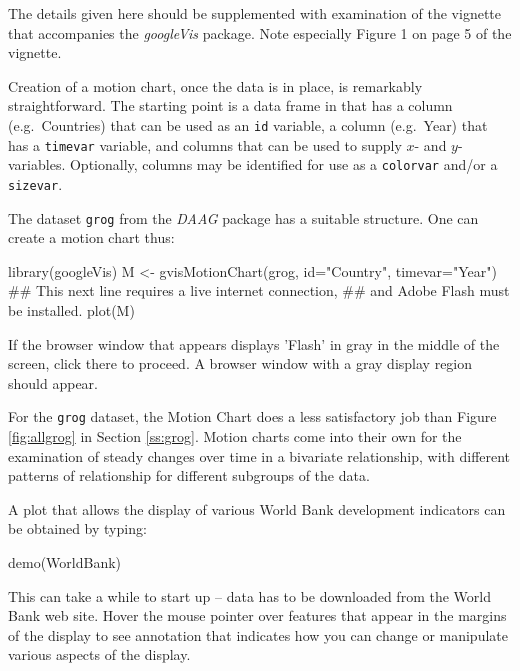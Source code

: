 \documentclass{tufte-book}\usepackage[]{graphicx}\usepackage[]{color}
\newcommand{\txtt}[1]{\texttt{#1}}
\begin{document}
The details given here should be supplemented with examination
of the vignette that accompanies the {\em
googleVis} package.  Note especially Figure 1 on page 5 of the
vignette.

Creation of a motion chart, once the data is in place, is remarkably
straightforward. The starting point is a data frame in that has a
column (e.g.\ Countries) that can be used as an \txtt{id} variable, a
column (e.g.\ Year) that has a \txtt{timevar} variable, and columns
that can be used to supply $x$- and $y$- variables.  Optionally,
columns may be identified for use as a \txtt{colorvar} and/or a
\txtt{sizevar}.

The dataset \txtt{grog} from the {\em DAAG} package has a suitable
structure.  One can create a motion chart thus:
\begin{minipage}[t]{1.075\textwidth}
\begin{Schunk}
\begin{Sinput}
library(googleVis)
M <- gvisMotionChart(grog, id="Country", timevar="Year")
## This next line requires a live internet connection,
## and Adobe Flash must be installed.
plot(M)
\end{Sinput}
\end{Schunk}
\end{minipage}
If the browser window that appears displays 'Flash' in gray in the
middle of the screen, click there to proceed.  A browser window with a
gray display region should appear.

For the \txtt{grog} dataset, the Motion Chart does a less satisfactory
job than Figure \ref{fig:allgrog} in Section \ref{ss:grog}.  Motion
charts come into their own for the examination of steady changes over
time in a bivariate relationship, with different patterns of
relationship for different subgroups of the data.

A plot that allows the display of various World Bank development
indicators can be obtained by typing:
\begin{Schunk}
\begin{Sinput}
demo(WorldBank)
\end{Sinput}
\end{Schunk}
This can take a while to start up -- data has to be downloaded from
the World Bank web site. Hover the mouse pointer over features that
appear in the margins of the display to see annotation that indicates
how you can change or manipulate various aspects of the display.
\end{document}
